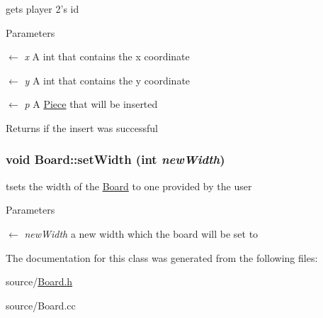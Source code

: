 gets player 2's id 
\begin{DoxyParams}{Parameters}
\item[\mbox{$\leftarrow$} {\em x}]A int that contains the x coordinate \item[\mbox{$\leftarrow$} {\em y}]A int that contains the y coordinate \item[\mbox{$\leftarrow$} {\em p}]A \hyperlink{classPiece}{Piece} that will be inserted \end{DoxyParams}
\begin{DoxyReturn}{Returns}
if the insert was successful 
\end{DoxyReturn}
\hypertarget{classBoard_ac1aed85ab99701f68b89d91c225a5ba7}{
\subsubsection[{setWidth}]{\setlength{\rightskip}{0pt plus 5cm}void Board::setWidth (int {\em newWidth})}}
\label{classBoard_ac1aed85ab99701f68b89d91c225a5ba7}


tsets the width of the \hyperlink{classBoard}{Board} to one provided by the user 
\begin{DoxyParams}{Parameters}
\item[\mbox{$\leftarrow$} {\em newWidth}]a new width which the board will be set to \end{DoxyParams}


The documentation for this class was generated from the following files:\begin{DoxyCompactItemize}
\item 
source/\hyperlink{Board_8h}{Board.h}\item 
source/Board.cc\end{DoxyCompactItemize}
